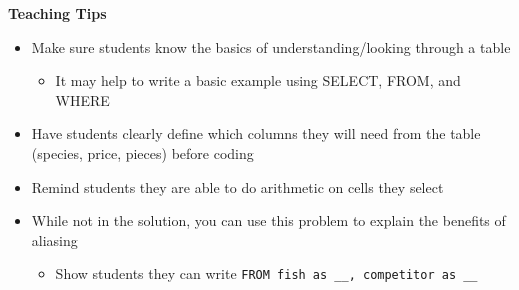 
\begin{blocksection}
\begin{guide}
\textbf{Teaching Tips}
\begin{itemize}
  \item Make sure students know the basics of understanding/looking through a table
  \begin{itemize}
    \item It may help to write a basic example using SELECT, FROM, and WHERE
  \end{itemize}
  \item Have students clearly define which columns they will need from the table (species, price, pieces) before coding
  \item Remind students they are able to do arithmetic on cells they select
  \item While not in the solution, you can use this problem to explain the benefits of aliasing
  \begin{itemize}
    \item Show students they can write \lstinline{FROM fish as __, competitor as __}
  \end{itemize}
\end{itemize}
\end{guide}
\end{blocksection}

